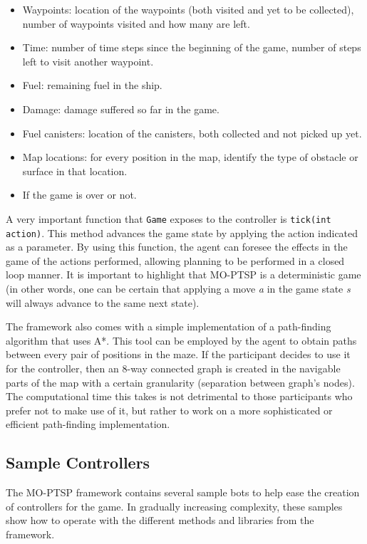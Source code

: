 \documentclass[conference]{IEEEtran}
\newcommand{\code}[1]{{\lstinline!#1!}}
\begin{document}
\begin{itemize}
\item Waypoints: location of the waypoints (both visited and yet to be collected), number of waypoints visited and how many are left.
\item Time: number of time steps since the beginning of the game, number of steps left to visit another waypoint.
\item Fuel: remaining fuel in the ship.
\item Damage: damage suffered so far in the game.
\item Fuel canisters: location of the canisters, both collected and not picked up yet.
\item Map locations: for every position in the map, identify the type of obstacle or surface in that location.
\item If the game is over or not.
\end{itemize}

A very important function that \code{Game} exposes to the controller is \code{tick(int action)}. This method advances the game state by applying the action indicated as a parameter. By using this function, the agent can foresee the effects in the game of the actions performed, allowing planning to be performed in a closed loop manner. It is important to highlight that MO-PTSP is a deterministic game (in other words, one can be certain that applying a move \textit{a} in the game state \textit{s} will always advance to the same next state).

The framework also comes with a simple implementation of a path-finding algorithm that uses A*. This tool can be employed by the agent to obtain paths between every pair of positions in the maze. If the participant decides to use it for the controller, then an 8-way connected graph is created in the navigable parts of the map with a certain granularity (separation between graph's nodes). The computational time this takes is not detrimental to those participants who prefer not to make use of it, but rather to work on a more sophisticated or efficient path-finding implementation.

\subsection{Sample Controllers} \label{ssec:sample} 

The MO-PTSP framework contains several sample bots to help ease the creation of controllers for the game. In gradually increasing complexity, these samples show how to operate with the different methods and libraries from the framework.
\end{document}
